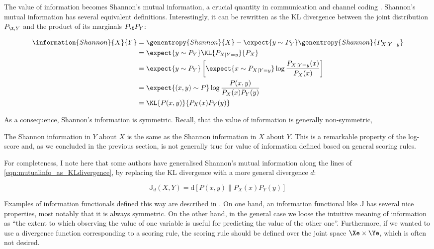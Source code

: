 The value of information becomes Shannon's mutual information, a crucial quantity in communication and channel coding \citep{Shannon1948, MacKay2002}. Shannon's mutual information has several equivalent definitions. Interestingly, it can be rewritten as the KL divergence between the joint distribution $P_{\X,Y}$ and the product of its marginals $P_{\X}P_{Y}$:

\begin{align}
	\information{Shannon}{X}{Y} &= \genentropy{Shannon}{X} - \expect{y \sim P_{Y}} \genentropy{Shannon}{P_{X\vert Y=y}}\\
		&= \expect{y \sim P_{Y}}\KL{P_{X\vert Y=y}}{P_X}\\
		&= \expect{y \sim P_{Y}}\left[\expect{x \sim P_{X\vert Y=y}} \log\frac{P_{X\vert Y=y}(x)}{P_X(x)} \right]\\
		&= \expect{(x,y) \sim P} \log \frac{P(x,y)}{P_{X}(x)P_{Y}(y)}\\
		&= \KL{P(x,y)}{P_{X}(x)P_{Y}(y)}\label{eqn:mutualinfo_as_KLdivergence}
\end{align}

As a consequence, Shannon's information is symmetric. Recall, that the value of information is generally non-symmetric, 

The Shannon information in $Y$ about $X$ is the same as the Shannon information in $X$ about $Y$. This is a remarkable property of the log-score and, as we concluded in the previous section, is not generally true for value of information defined based on general scoring rules.

For completeness, I note here that some authors have generalised Shannon's mutual information along the lines of \eqref{eqn:mutualinfo_as_KLdivergence}, by replacing the KL divergence with a more general divergence $d$:

\begin{equation}
	\mathbb{J}_{d}(X,Y) = \mbox{d}\left[ P(x,y) \middle\| P_{X}(x)P_{Y}(y) \right]\label{mutualinfo_generalisations}
\end{equation}

Examples of information functionals defined this way are described in \citep{Poczos2011}.
On one hand, an information functional like $\mathbb{J}$ has several nice properties, most notably that it is always symmetric. On the other hand, in the general case we loose the intuitive meaning of information as ``the extent to which observing the value of one variable is useful for predicting the value of the other one''. Furthermore, if we wanted to use a divergence function corresponding to a scoring rule, the scoring rule should be defined over the joint space $\Xe\times\Ye$, which is often not desired.


